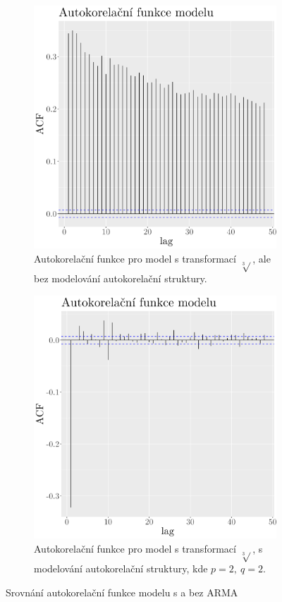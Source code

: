 \begin{figure}
	\centering
	\begin{subfigure}{0.45\textwidth}
  \includegraphics[width=\textwidth]{img/ch2/acf_curt.png}
		\caption{Autokorelační funkce pro model s transformací $\sqrt[3]{}$, ale bez modelování autokorelační struktury.}
		\label{fig:acf_curtnoARMA}
	\end{subfigure}
	\hfill
	\begin{subfigure}{0.45\textwidth}
  \includegraphics[width=\textwidth]{img/ch2/acf_curtARMA22.png}
		\caption{Autokorelační funkce pro model s transformací $\sqrt[3]{}$, s modelování autokorelační struktury, kde $p=2,\ q=2$.}
		\label{fig:acf_curtARMA22}
	\end{subfigure}
	\caption{Srovnání autokorelační funkce modelu s a bez ARMA}
	\label{fig:acf_curt}
\end{figure}
